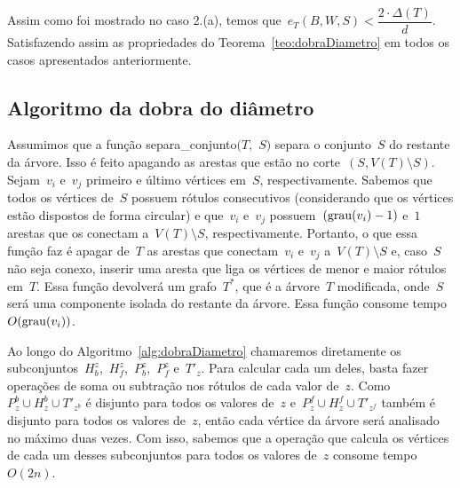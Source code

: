 	Assim como foi mostrado no caso 2.(a), temos 
	que~${e_T(B,W,S)<\dfrac{2\cdot \Delta(T)}{d}}$.
	Satisfazendo assim as propriedades do Teorema~\ref{teo:dobraDiametro} em todos os casos apresentados anteriormente.

	


	\bigskip
	\bigskip
	\bigskip

	\subsection{Algoritmo da dobra do diâmetro}

		Assumimos que a função {\sc separa\_conjunto}$(T,$ $S)$
		separa o conjunto~$S$ do restante da árvore.
		Isso é feito apagando as arestas que estão no 
		corte~$(S,V(T)\setminus S)$.
		Sejam~$v_i$ e~$v_j$ primeiro e último vértices em~$S$, respectivamente.
		Sabemos que todos os vértices de~$S$ possuem
		rótulos consecutivos 
		(considerando que os vértices estão dispostos de forma circular)
		e que~$v_i$ e~$v_j$ possuem~${(\mathrm{grau}(v_i)-1)}$
		e~$1$ arestas que os conectam a~$V(T)\setminus S$, respectivamente.
		Portanto, o que essa função faz é apagar de~$T$ as arestas que 
		conectam~$v_i$ e~$v_j$ a~$V(T)\setminus S$ e, caso~$S$ não seja
		conexo, inserir uma aresta que liga os vértices de menor e maior rótulos em~$T$.
		Essa função devolverá um grafo~$T^*$, que é a árvore~$T$ modificada,
		onde~$S$ será uma componente
		isolada do restante da árvore. 
		Essa função consome tempo~$O(\mathrm{grau}(v_i))$.

		Ao longo do Algoritmo~\ref{alg:dobraDiametro} chamaremos diretamente
		os subconjuntos~$H_b^z$,~$H_f^z$,~$P_b^z$,~$P_f^z$ e~$T'_z$.
		Para calcular cada um deles, basta fazer operações de soma ou subtração
		nos rótulos de cada valor de~$z$.
		Como~${P^b_z\cup H^b_z\cup T'_{z^b}}$ é disjunto para todos os 
		valores de~$z$ e~${P^f_z\cup H^f_z\cup T'_{z^f}}$ também é disjunto
		para todos os valores de~$z$,
		então cada vértice da árvore será analisado no máximo duas vezes.
		Com isso, sabemos que a operação que calcula os vértices de cada um desses 
		subconjuntos para todos os valores de~$z$ consome tempo~$O(2n)$.


